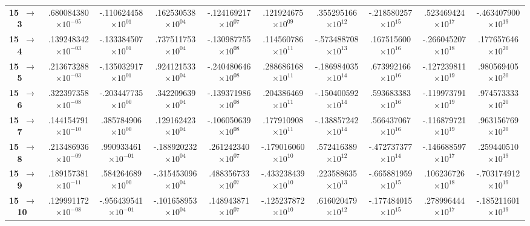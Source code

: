 \documentclass[reviewcopy]{elsarticle}
\begin{document}
\begin{landscape}
\begin{longtable}{lccccccccc}
{\bf 15~$\to$~ 3}   &   .680084380$\times10^{-05}$ & -.110624458$\times10^{ 01}$ &  .162530538$\times10^{ 04}$ & -.124169217$\times10^{ 07}$ &  .121924675$\times10^{ 09}$ &  .355295166$\times10^{ 12}$ & -.218580257$\times10^{ 15}$ &  .523469424$\times10^{ 17}$ & -.463407900$\times10^{ 19}$ \\
{\bf 15~$\to$~ 4}   &   .139248342$\times10^{-03}$ & -.133384507$\times10^{ 01}$ &  .737511753$\times10^{ 04}$ & -.130987755$\times10^{ 08}$ &  .114560786$\times10^{ 11}$ & -.573488708$\times10^{ 13}$ &  .167515600$\times10^{ 16}$ & -.266045207$\times10^{ 18}$ &  .177657646$\times10^{ 20}$ \\
{\bf 15~$\to$~ 5}   &   .213673288$\times10^{-03}$ & -.135032917$\times10^{ 01}$ &  .924121533$\times10^{ 04}$ & -.240480646$\times10^{ 08}$ &  .288686168$\times10^{ 11}$ & -.186984035$\times10^{ 14}$ &  .673992166$\times10^{ 16}$ & -.127239811$\times10^{ 19}$ &  .980569405$\times10^{ 20}$ \\
{\bf 15~$\to$~ 6}   &   .322397358$\times10^{-08}$ & -.203447735$\times10^{ 00}$ &  .342209639$\times10^{ 04}$ & -.139371986$\times10^{ 08}$ &  .204386469$\times10^{ 11}$ & -.150400592$\times10^{ 14}$ &  .593683383$\times10^{ 16}$ & -.119973791$\times10^{ 19}$ &  .974573333$\times10^{ 20}$ \\
{\bf 15~$\to$~ 7}   &   .144154791$\times10^{-10}$ &  .385784906$\times10^{ 00}$ &  .129162423$\times10^{ 04}$ & -.106050639$\times10^{ 08}$ &  .177910908$\times10^{ 11}$ & -.138857242$\times10^{ 14}$ &  .566437067$\times10^{ 16}$ & -.116879721$\times10^{ 19}$ &  .963156769$\times10^{ 20}$ \\
{\bf 15~$\to$~ 8}   &   .213486936$\times10^{-09}$ &  .990933461$\times10^{-01}$ & -.188920232$\times10^{ 04}$ &  .261242340$\times10^{ 07}$ & -.179016060$\times10^{ 10}$ &  .572416389$\times10^{ 12}$ & -.472737377$\times10^{ 14}$ & -.146688597$\times10^{ 17}$ &  .259440510$\times10^{ 19}$ \\
{\bf 15~$\to$~ 9}   &   .189157381$\times10^{-11}$ &  .584264689$\times10^{ 00}$ & -.315453096$\times10^{ 04}$ &  .488356733$\times10^{ 07}$ & -.433238439$\times10^{ 10}$ &  .223588635$\times10^{ 13}$ & -.665881959$\times10^{ 15}$ &  .106236726$\times10^{ 18}$ & -.703174912$\times10^{ 19}$ \\
{\bf 15~$\to$~ 10}  &   .129991172$\times10^{-08}$ & -.956439541$\times10^{-01}$ & -.101658953$\times10^{ 04}$ &  .148943871$\times10^{ 07}$ & -.125237872$\times10^{ 10}$ &  .616020479$\times10^{ 12}$ & -.177484015$\times10^{ 15}$ &  .278996444$\times10^{ 17}$ & -.185211601$\times10^{ 19}$ \\

\end{longtable}
\end{landscape}
\end{document}
